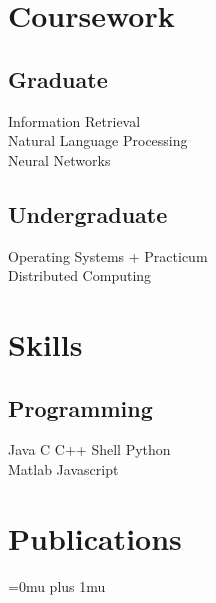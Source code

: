 \documentclass[]{deedy-resume-openfont}
\begin{document}
\begin{minipage}[t]{0.33\textwidth}

\section{Coursework}
\subsection{Graduate}
Information Retrieval \\
Natural Language Processing \\
Neural Networks \\
\sectionsep

\subsection{Undergraduate}
Operating Systems + Practicum \\
Distributed Computing  \\


\section{Skills}
\subsection{Programming}
Java \textbullet{} C \textbullet{} C++ \textbullet{} Shell \textbullet{} Python \\
Matlab \textbullet{} Javascript \\
\sectionsep


\section{Publications} 
\renewcommand\refname{\vskip -0.75cm} %
\Urlmuskip=0mu plus 1mu\relax


\nocite{*}

%
%

\end{minipage} 
\end{document}
